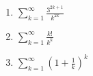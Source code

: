 \documentclass[week=6]{homework}
\begin{document}
\begin{questions}
\begin{enumerate}[label=(\alph*)]
	    	\addtocounter{enumi}{2}
	    	\item $\displaystyle \sum_{k=1}^{\infty} \frac{3^{2k+1}}{k^{2k}}$
	    	
	    	
	    	\addtocounter{enumi}{1}
	    	\item $\displaystyle \sum_{k=1}^{\infty} \frac{k!}{k^k}$
	    	
	    	
	    	\addtocounter{enumi}{1}
	    	\item $\displaystyle \sum_{k=1}^{\infty} \left(1 + \frac{1}{k}\right)^k$
	    	
	    \end{enumerate}
     \end{questions}
\end{document}
